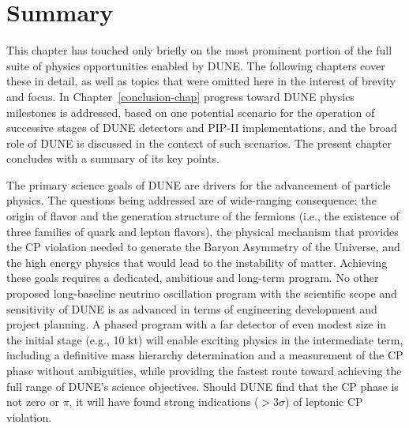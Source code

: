 
%
\section{Summary}


This chapter has touched only briefly on the most prominent portion of
the full suite of physics opportunities enabled by DUNE.  
The following chapters cover these in detail, as well as
topics that were omitted here in the interest of brevity and focus.
In Chapter~\ref{conclusion-chap} progress toward
DUNE physics milestones is addressed, based on one potential scenario
for the operation of successive stages of DUNE detectors and PIP-II
implementations,
and the broad role of DUNE is discussed 
in the context of such scenarios.
The present chapter concludes with a summary of its key points.

The primary science goals of DUNE are drivers for the advancement of
particle physics. The questions being addressed are of wide-ranging
consequence: the origin of flavor and the generation structure of the
fermions (i.e., the existence of three families of quark and lepton flavors), 
the physical mechanism that provides the CP violation needed
to generate the Baryon Asymmetry of the Universe, 
and the high energy
physics that would lead to the instability of matter.
Achieving these goals requires a dedicated, ambitious and long-term
program.  No other proposed long-baseline neutrino oscillation program
with the scientific scope and sensitivity of DUNE is as advanced in terms of
engineering development and project planning.  A phased program with a
far detector of even modest size in the initial stage (e.g., 10 kt) will
enable exciting physics in the intermediate term, including a
definitive mass hierarchy determination and a measurement of the CP
phase without ambiguities, while providing the fastest route toward
achieving the full range of DUNE's science objectives.  Should DUNE find
that the CP phase is not zero or $\pi$, it will have found strong
indications ($>3\sigma$) of leptonic CP violation.  


